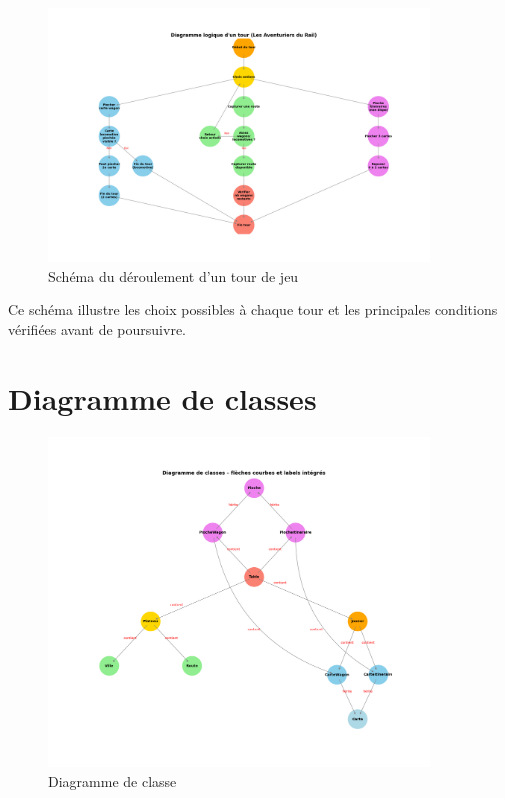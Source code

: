 \documentclass[a4paper,12pt]{report}
\begin{document}
\begin{figure}[H]
    \centering
    \includegraphics[width=0.9\textwidth]{graph_logique}
    \caption{Schéma du déroulement d’un tour de jeu}
    \label{fig:tour_de_jeu}
\end{figure}

\noindent Ce schéma illustre les choix possibles à chaque tour et les principales conditions vérifiées avant de poursuivre.



\section{Diagramme de classes}

\begin{figure}[H]
    \centering
    \includegraphics[width=0.9\textwidth]{diagramme_classe}
    \caption{Diagramme de classe}
    \label{fig:diagramme_classe}
\end{figure}
\end{document}
